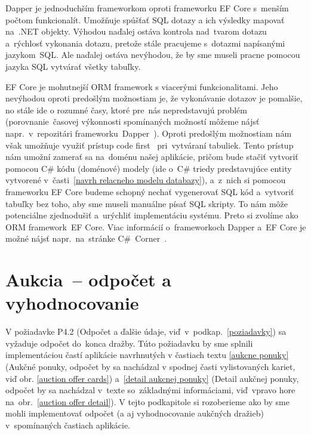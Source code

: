 Dapper je jednoduchším frameworkom oproti frameworku EF Core s~menším počtom funkcionalít. Umožňuje spúšťať SQL dotazy a ich výsledky mapovať na~.NET objekty. Výhodou naďalej ostáva kontrola nad~tvarom dotazu a~rýchlosť vykonania dotazu, pretože stále pracujeme s~dotazmi napísanými jazykom~SQL. Ale naďalej ostáva nevýhodou, že by sme museli pracne pomocou jazyka SQL vytvárať všetky tabuľky.

EF Core je mohutnejší ORM framework s viacerými funkcionalitami. Jeho nevýhodou oproti predošlým možnostiam je, že vykonávanie dotazov je pomalšie, no stále ide o rozumné časy, ktoré pre~nás nepredstavujú problém (porovnanie~časovej výkonnosti spomínaných možností môžeme nájsť napr.~v~repozitári frameworku~Dapper~\cite{dapper repo}). Oproti predošlým možnostiam nám však umožňuje využiť prístup code first~\cite{code first} pri~vytváraní tabuliek. Tento prístup nám umožní zamerať sa na~doménu našej aplikácie, pričom bude stačiť vytvoriť pomocou C\# kódu (doménové) modely (ide o~C\# triedy predstavujúce entity vytvorené v~časti~\ref{navrh relacneho modelu databazy}), a~z~nich si pomocou frameworku EF Core budeme schopný nechať vygenerovať SQL kód a~vytvoriť tabuľky bez toho, aby sme museli manuálne písať SQL skripty. To nám môže potenciálne zjednodušiť a~urýchliť implementáciu systému. Preto si zvolíme ako ORM framework~EF Core. Viac informácií o~frameworkoch Dapper a~EF Core je možné nájsť napr.~na~stránke C\#~Corner~\cite{csharp corner}.

\section{Aukcia~-- odpočet a vyhodnocovanie}
\label{aukcia odpocet a vyhodnocovanie}

V požiadavke P4.2 (Odpočet a ďalšie údaje, viď~v~podkap.~\ref{poziadavky}) sa vyžaduje odpočet do~konca dražby. Túto požiadavku by sme splnili implementáciou častí aplikácie navrhnutých v častiach textu \ref{aukcne ponuky} (Aukčné ponuky, odpočet by sa nachádzal v spodnej časti vylistovaných kariet, viď obr. \ref{auction offer cards}) a~\ref{detail aukcnej ponuky} (Detail aukčnej ponuky, odpočet by sa nachádzal v~texte so~základnými informáciami, viď~vpravo hore na~obr.~\ref{auction offer detail}). V tejto podkapitole si rozoberieme ako by sme mohli implementovať odpočet (a aj vyhodnocovanie aukčných dražieb) v~spomínaných častiach aplikácie.

